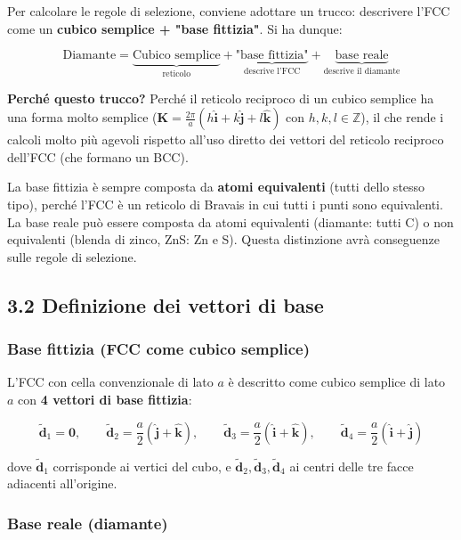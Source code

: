 Per calcolare le regole di selezione, conviene adottare un trucco: descrivere l'FCC come un \textbf{cubico semplice + "base fittizia"}. Si ha dunque:

$$\text{Diamante} = \underbrace{\text{Cubico semplice}}_{\text{reticolo}} + \underbrace{\text{"base fittizia"}}_{\text{descrive l'FCC}} + \underbrace{\text{base reale}}_{\text{descrive il diamante}}$$

\textbf{Perché questo trucco?} Perché il reticolo reciproco di un cubico semplice ha una forma molto semplice ($\mathbf{K} = \frac{2\pi}{a}(h\hat{\mathbf{i}} + k\hat{\mathbf{j}} + l\hat{\mathbf{k}})$ con $h, k, l \in \mathbb{Z}$), il che rende i calcoli molto più agevoli rispetto all'uso diretto dei vettori del reticolo reciproco dell'FCC (che formano un BCC).

\begin{nota}[Osservazione]
La base fittizia è sempre composta da \textbf{atomi equivalenti} (tutti dello stesso tipo), perché l'FCC è un reticolo di Bravais in cui tutti i punti sono equivalenti. La base reale può essere composta da atomi equivalenti (diamante: tutti C) o non equivalenti (blenda di zinco, ZnS: Zn e S). Questa distinzione avrà conseguenze sulle regole di selezione.
\end{nota}

\subsection*{3.2 Definizione dei vettori di base}

\subsubsection*{Base fittizia (FCC come cubico semplice)}

L'FCC con cella convenzionale di lato $a$ è descritto come cubico semplice di lato $a$ con \textbf{4 vettori di base fittizia}:

$$\tilde{\mathbf{d}}_1 = \mathbf{0}, \qquad \tilde{\mathbf{d}}_2 = \frac{a}{2}(\hat{\mathbf{j}} + \hat{\mathbf{k}}), \qquad \tilde{\mathbf{d}}_3 = \frac{a}{2}(\hat{\mathbf{i}} + \hat{\mathbf{k}}), \qquad \tilde{\mathbf{d}}_4 = \frac{a}{2}(\hat{\mathbf{i}} + \hat{\mathbf{j}})$$

dove $\tilde{\mathbf{d}}_1$ corrisponde ai vertici del cubo, e $\tilde{\mathbf{d}}_2, \tilde{\mathbf{d}}_3, \tilde{\mathbf{d}}_4$ ai centri delle tre facce adiacenti all'origine.

\subsubsection*{Base reale (diamante)}

